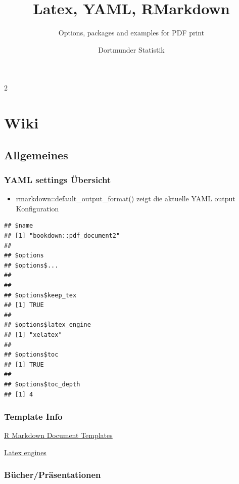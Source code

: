 \documentclass[
  a4paper,
  twoside]{article}
\title{Latex, YAML, RMarkdown}
\subtitle{Options, packages and examples for PDF print}
\author{Dortmunder Statistik}
\date{}
\providecommand{\tightlist}{%
  \setlength{\itemsep}{0pt}\setlength{\parskip}{0pt}}
\begin{document}
\maketitle

{
\hypersetup{linkcolor=}
\setcounter{tocdepth}{4}
\tableofcontents
}
\newpage

\begin {multicols}{2}

\hypertarget{wiki}{%
\section{Wiki}\label{wiki}}

\hypertarget{allgemeines}{%
\subsection{Allgemeines}\label{allgemeines}}

\hypertarget{yaml-settings-uxfcbersicht}{%
\subsubsection{YAML settings Übersicht}\label{yaml-settings-uxfcbersicht}}

\begin{itemize}
\tightlist
\item
  rmarkdown::default\_output\_format() zeigt die aktuelle YAML output Konfiguration
\end{itemize}

\begin{verbatim}
## $name
## [1] "bookdown::pdf_document2"
## 
## $options
## $options$...
## 
## 
## $options$keep_tex
## [1] TRUE
## 
## $options$latex_engine
## [1] "xelatex"
## 
## $options$toc
## [1] TRUE
## 
## $options$toc_depth
## [1] 4
\end{verbatim}

\hypertarget{template-info}{%
\subsubsection{Template Info}\label{template-info}}

\href{https://rstudio.github.io/rstudio-extensions/rmarkdown_templates.html}{R Markdown Document Templates}

\href{https://tex.stackexchange.com/questions/36/differences-between-luatex-context-and-xetex}{Latex engines}

\hypertarget{buxfccherpruxe4sentationen}{%
\subsubsection{Bücher/Präsentationen}\label{buxfccherpruxe4sentationen}}


\end{multicols}
\end{document}
